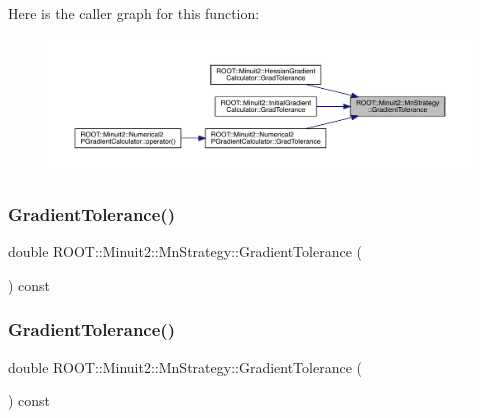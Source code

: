 Here is the caller graph for this function\+:
\nopagebreak
\begin{figure}[H]
\begin{center}
\leavevmode
\includegraphics[width=350pt]{da/de4/classROOT_1_1Minuit2_1_1MnStrategy_a94681b616c41570e2c81ef5c94cb81dd_icgraph}
\end{center}
\end{figure}
\mbox{\label{classROOT_1_1Minuit2_1_1MnStrategy_a94681b616c41570e2c81ef5c94cb81dd}} 
\subsubsection{\texorpdfstring{GradientTolerance()}{GradientTolerance()}\hspace{0.1cm}{\footnotesize\ttfamily [2/3]}}
{\footnotesize\ttfamily double R\+O\+O\+T\+::\+Minuit2\+::\+Mn\+Strategy\+::\+Gradient\+Tolerance (\begin{DoxyParamCaption}{ }\end{DoxyParamCaption}) const\hspace{0.3cm}{\ttfamily [inline]}}

\mbox{\label{classROOT_1_1Minuit2_1_1MnStrategy_a94681b616c41570e2c81ef5c94cb81dd}} 
\subsubsection{\texorpdfstring{GradientTolerance()}{GradientTolerance()}\hspace{0.1cm}{\footnotesize\ttfamily [3/3]}}
{\footnotesize\ttfamily double R\+O\+O\+T\+::\+Minuit2\+::\+Mn\+Strategy\+::\+Gradient\+Tolerance (\begin{DoxyParamCaption}{ }\end{DoxyParamCaption}) const\hspace{0.3cm}{\ttfamily [inline]}}

